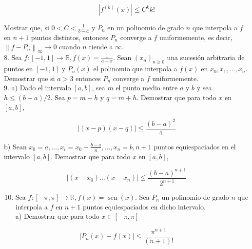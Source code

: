 \documentclass[10pt]{book}
\begin{document}
$$
\left|f^{(k)}(x)\right| \leq C^{k} k!
$$

Mostrar que, si $0<C<\frac{1}{b-a}$ y $P_{n}$ en un polinomio de grado $n$ que interpola a $f$ en $n+1$ puntos distintos, entonces $P_{n}$ converge a $f$ uniformemente, es decir, $\left\|f-P_{n}\right\|_{\infty} \rightarrow 0$ cuando $n$ tiende a $\infty$.\\
8. Sea $f:[-1,1] \rightarrow \mathbb{R}, f(x)=\frac{1}{a+x}$. Sean $\left(x_{n}\right)_{n \geq 0}$ una sucesión arbitraria de puntos en $[-1,1]$ y $P_{n}(x)$ el polinomio que interpola a $f(x)$ en $x_{0}, x_{1}, \ldots, x_{n}$. Demostrar que si $a>3$ entonces $P_{n}$ converge a $f$ uniformemente.\\
9. a) Dado el intervalo $[a, b]$, sea $m$ el punto medio entre $a$ y $b$ y sea $h \leq(b-a) / 2$. Sea $p=m-h$ y $q=m+h$. Demostrar que para todo $x$ en $[a, b]$,

$$
|(x-p)(x-q)| \leq \frac{(b-a)^{2}}{4}
$$

b) Sean $x_{0}=a, \ldots, x_{i}=x_{0}+\frac{b-a}{n}, \ldots, x_{n}=b, n+1$ puntos equiespaciados en el intervalo $[a, b]$. Demostrar que para todo $x$ en $[a, b]$,

$$
\left|\left(x-x_{0}\right) \ldots\left(x-x_{n}\right)\right| \leq \frac{(b-a)^{n+1}}{2^{n+1}}
$$

\begin{enumerate}
  \setcounter{enumi}{9}
  \item Sea $f:[-\pi, \pi] \rightarrow \mathbb{R}, f(x)=\operatorname{sen}(x)$. Sea $P_{n}$ un polinomio de grado $n$ que interpola a $f$ en $n+1$ puntos equiespaciados en dicho intervalo.\\
a) Demostrar que para todo $x \in[-\pi, \pi]$
\end{enumerate}

$$
\left|P_{n}(x)-f(x)\right| \leq \frac{\pi^{n+1}}{(n+1)!}
$$
\end{document}
